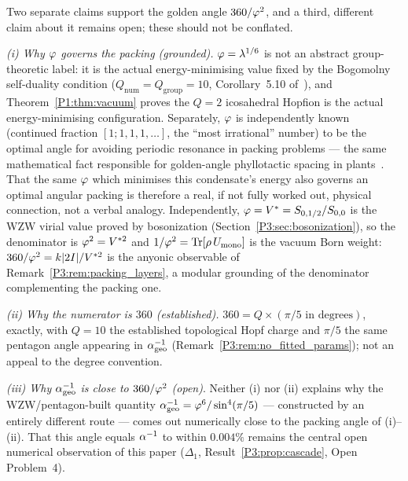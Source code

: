 \begin{remark}
\label{P3:rem:why_golden_angle}
Two separate claims support the golden angle $360/\varphi^2$, and a third,
different claim about it remains open; these should not be conflated.

\emph{(i) Why $\varphi$ governs the packing (grounded).} $\varphi=\lambda^{1/6}$ is
not an abstract group-theoretic label: it is the actual energy-minimising
value fixed by the Bogomolny self-duality condition
($Q_{\mathrm{num}}=Q_{\mathrm{group}}=10$, Corollary~5.10
of~\cite{Paper1}), and Theorem~\ref{P1:thm:vacuum} proves the $Q=2$
icosahedral Hopfion is the actual energy-minimising configuration. Separately,
$\varphi$ is independently known (continued fraction $[1;1,1,1,\ldots]$, the
``most irrational'' number) to be the optimal angle for avoiding periodic
resonance in packing problems --- the same mathematical fact responsible
for golden-angle phyllotactic spacing in plants~\cite{Jean1994}. That the
same $\varphi$ which minimises this condensate's energy also governs an
optimal angular packing is therefore a real, if not fully worked out,
physical connection, not a verbal analogy.  Independently, $\varphi = V^*
= S_{0,1/2}/S_{0,0}$ is the WZW virial value proved by bosonization
(Section~\ref{P3:sec:bosonization}), so the denominator is
$\varphi^2=V^{*2}$ and $1/\varphi^2 = \operatorname{Tr}[\rho\,U_{\mathrm{mono}}]$
is the vacuum Born weight: $360/\varphi^2 = k|2I|/V^{*2}$ is the anyonic
observable of Remark~\ref{P3:rem:packing_layers}, a modular grounding
of the denominator complementing the packing one.

\emph{(ii) Why the numerator is $360$ (established).} $360 =
Q\times(\pi/5\text{ in degrees})$, exactly, with $Q=10$ the established
topological Hopf charge and $\pi/5$ the same pentagon angle appearing in
$\alpha^{-1}_{\mathrm{geo}}$ (Remark~\ref{P3:rem:no_fitted_params}); not an
appeal to the degree convention.

\emph{(iii) Why $\alpha^{-1}_{\mathrm{geo}}$ is close to $360/\varphi^2$ (open)}.
Neither (i) nor (ii) explains why the WZW/pentagon-built quantity
$\alpha^{-1}_{\mathrm{geo}}=\varphi^6/\sin^4(\pi/5)$ --- constructed by an entirely
different route --- comes out numerically close to the packing angle of
(i)--(ii). That this angle equals $\alpha^{-1}$ to within $0.004\%$ remains the
central open numerical observation of this paper ($\Delta_1$,
Result~\ref{P3:prop:cascade}, Open Problem~4).
\end{remark}

